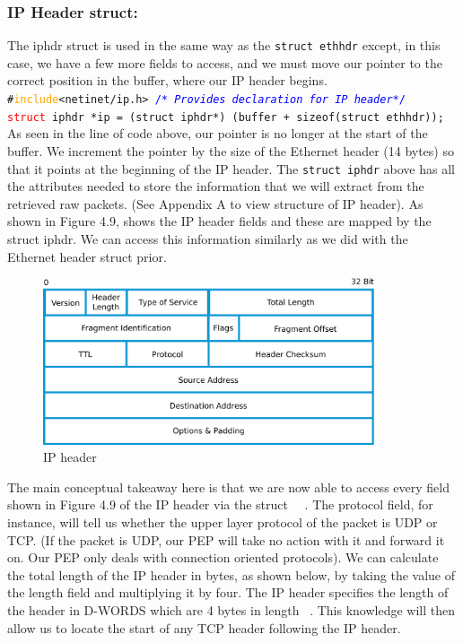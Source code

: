 \subsubsection*{IP Header struct:}
The iphdr struct is used in the same way as the {\tt struct ethhdr} except, in this case, we have a few more fields to access, and we must move our pointer to the correct position in the buffer, where our IP header begins. \\
{\tt{\#}\textcolor{orange}{include}<netinet/ip.h> \textcolor{blue}{{\//*} \emph{Provides declaration for IP header}{\/*/}} \\

\noindent \textcolor{red}{struct} iphdr *ip = (struct iphdr*) (buffer + sizeof(struct ethhdr));}\\

As seen in the line of code above, our pointer is no longer at the start of the buffer. We increment the pointer by the size of the Ethernet header (14 bytes) so that it points at the beginning of the IP header. The {\tt struct iphdr} above has all the attributes needed to store the information that we will extract from the retrieved raw packets. (See Appendix A to view structure of IP header). As shown in Figure 4.9, shows the IP header fields and these are mapped by the struct iphdr. We can access this information similarly as we did with the Ethernet header struct prior. \\


\begin{figure}[h!]
    \centering
    \includegraphics[width=0.87\textwidth]{ipheader.pdf}
    \caption{IP header}
    \label{IPheader} 
\end{figure}

The main conceptual takeaway here is that we are now able to access every field shown in Figure 4.9 of the IP header via the struct ~\cite{35}~\cite{38}. The protocol field, for instance, will tell us whether the upper layer protocol of the packet is UDP or TCP. (If the packet is UDP, our PEP will take no action with it and forward it on. Our PEP only deals with connection oriented protocols). We can calculate the total length of the IP header in bytes, as shown below, by taking the value of the length field and multiplying it by four. The IP header specifies the length of the header in D-WORDS which are 4 bytes in length ~\cite{2}. This knowledge will then allow us to locate the start of any TCP header following the IP header.\\

